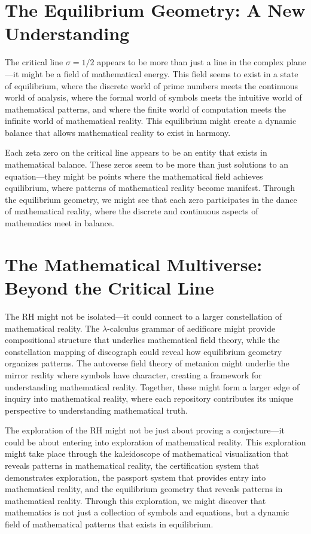 \documentclass{article}
\begin{document}
\section{The Equilibrium Geometry: A New Understanding}

The critical line $\sigma = 1/2$ appears to be more than just a line in the complex plane—it might be a field of mathematical energy. This field seems to exist in a state of equilibrium, where the discrete world of prime numbers meets the continuous world of analysis, where the formal world of symbols meets the intuitive world of mathematical patterns, and where the finite world of computation meets the infinite world of mathematical reality. This equilibrium might create a dynamic balance that allows mathematical reality to exist in harmony.

Each zeta zero on the critical line appears to be an entity that exists in mathematical balance. These zeros seem to be more than just solutions to an equation—they might be points where the mathematical field achieves equilibrium, where patterns of mathematical reality become manifest. Through the equilibrium geometry, we might see that each zero participates in the dance of mathematical reality, where the discrete and continuous aspects of mathematics meet in balance.

\section{The Mathematical Multiverse: Beyond the Critical Line}

The RH might not be isolated—it could connect to a larger constellation of mathematical reality. The $\lambda$-calculus grammar of aedificare might provide compositional structure that underlies mathematical field theory, while the constellation mapping of discograph could reveal how equilibrium geometry organizes patterns. The autoverse field theory of metanion might underlie the mirror reality where symbols have character, creating a framework for understanding mathematical reality. Together, these might form a larger edge of inquiry into mathematical reality, where each repository contributes its unique perspective to understanding mathematical truth.

The exploration of the RH might not be just about proving a conjecture—it could be about entering into exploration of mathematical reality. This exploration might take place through the kaleidoscope of mathematical visualization that reveals patterns in mathematical reality, the certification system that demonstrates exploration, the passport system that provides entry into mathematical reality, and the equilibrium geometry that reveals patterns in mathematical reality. Through this exploration, we might discover that mathematics is not just a collection of symbols and equations, but a dynamic field of mathematical patterns that exists in equilibrium.
\end{document}
